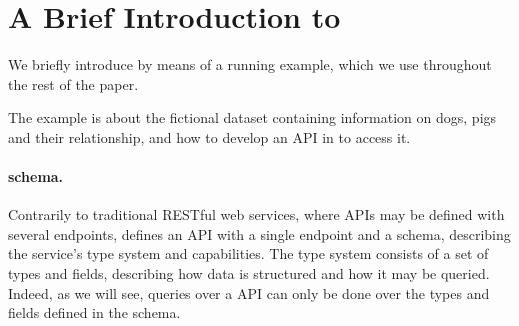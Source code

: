 \section{A Brief Introduction to \gql}\label{sec:bg}


We briefly introduce \gql by means of a running example, which we use throughout the rest of the paper.

The example is about the fictional \goodbois dataset containing information on dogs, pigs and their relationship, 
and how to develop an API in \gql to access it.


\paragraph{\gql schema.}

Contrarily to traditional RESTful web services, where APIs may be defined with several endpoints, 
\gql defines an API with a single endpoint and a schema, describing the service's type system and capabilities.
The type system consists of a set of types and fields, describing how data is structured and how it may be queried.
Indeed, as we will see, queries over a \gql API can only be done over the types and fields defined in the schema.

